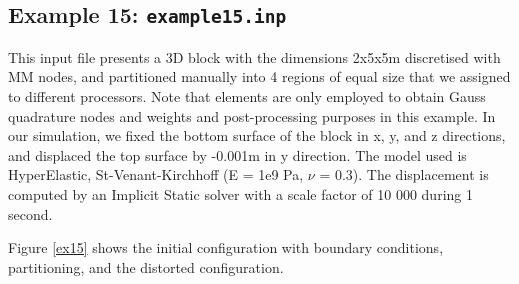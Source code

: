 \documentclass[oneside,11pt,times]{book}
\begin{document}
\newpage
\subsection{Example 15: \texttt{example15.inp}}

This input file presents a 3D block with the dimensions 2x5x5m discretised with MM nodes, and partitioned manually into 4 regions of equal size that we assigned to different processors. Note that elements are only employed to obtain Gauss quadrature nodes and weights and post-processing purposes in this example. In our simulation, we fixed the bottom surface of the block in x, y, and z directions, and displaced the top surface by -0.001m in y direction. The model used is HyperElastic, St-Venant-Kirchhoff (E = 1e9 Pa, $\nu$ = 0.3). The displacement is computed by an Implicit Static solver with a scale factor of 10 000 during 1 second.

\medbreak
Figure \ref{ex15} shows the initial configuration with boundary conditions, partitioning, and the distorted configuration.
\end{document}
